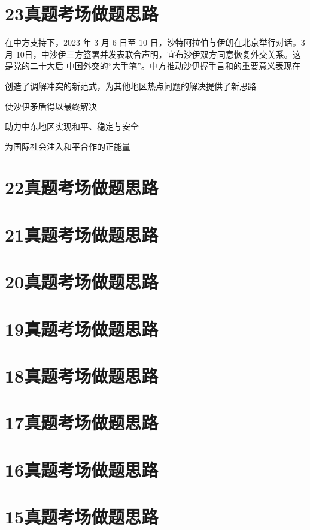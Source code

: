 \documentclass[lang=cn,newtx,10pt,scheme=chinese,pad,twocol]{zznote}
\begin{document}
\nocite{*}

\printbibliography[heading=bibintoc, title=\ebibname]
\appendix


\section{23真题考场做题思路}
\begin{exercise}在中方支持下，2023 年 3 月 6 日至 10 日，沙特阿拉伯与伊朗在北京举行对话。3 月 10日，中沙伊三方签署并发表联合声明，宜布沙伊双方同意恢复外交关系。这是党的二十大后 中国外交的“大手笔”。中方推动沙伊握手言和的重要意义表现在
	\begin{choice}
		\item 创造了调解冲突的新范式，为其他地区热点问题的解决提供了新思路
		\item 使沙伊矛盾得以最终解决
		\item 助力中东地区实现和平、稳定与安全
		\item 为国际社会注入和平合作的正能量
	\end{choice}
\end{exercise}
\section{22真题考场做题思路}
\section{21真题考场做题思路}
\section{20真题考场做题思路}
\section{19真题考场做题思路}
\section{18真题考场做题思路}
\section{17真题考场做题思路}
\section{16真题考场做题思路}
\section{15真题考场做题思路}
\end{document}
